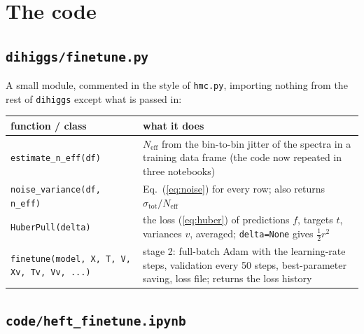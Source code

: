 \documentclass[11pt]{article}
\newcommand{\file}[1]{\nolinkurl{#1}}
\newcommand{\code}[1]{\texttt{#1}}
\begin{document}
\section{The code}
\label{sec:code}

\subsection{\texttt{dihiggs/finetune.py}}

A small module, commented in the style of \file{hmc.py}, importing nothing from the rest of
\code{dihiggs} except what is passed in:

\begin{center}
\small
\begin{tabular}{p{}p{}}
\toprule
function / class & what it does\\
\midrule
\code{estimate\_n\_eff(df)} & $N_\text{eff}$ from the bin-to-bin jitter of the spectra in a
  training data frame (the code now repeated in three notebooks)\\
\code{noise\_variance(df, n\_eff)} & Eq.~(\ref{eq:noise}) for every row; also returns
  $\sigma_\text{tot}/N_\text{eff}$\\
\code{HuberPull(delta)} & the loss (\ref{eq:huber}) of predictions $f$, targets $t$,
  variances $v$, averaged; \code{delta=None} gives $\tfrac12 r^2$\\
\code{finetune(model, X, T, V, Xv, Tv, Vv, ...)} & stage 2: full-batch Adam with the
  learning-rate steps, validation every 50 steps, best-parameter saving, loss file; returns
  the loss history\\
\bottomrule
\end{tabular}
\end{center}

\subsection{\texttt{code/heft\_finetune.ipynb}}
\end{document}
